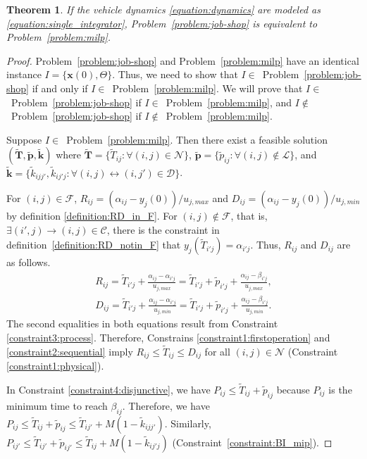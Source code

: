 \documentclass{sig-alternate}
\newtheorem{theorem}{Theorem}
\begin{document}
\begin{theorem}\label{theorem:P3_equivalent_P4}
	If the vehicle dynamics \eqref{equation:dynamics} are modeled as \eqref{equation:single_integrator}, Problem~\ref{problem:job-shop} is equivalent to Problem~\ref{problem:milp}.
\end{theorem}
\begin{proof}
	Problem~\ref{problem:job-shop} and Problem~\ref{problem:milp} have an identical instance $I=\{\mathbf{x}(0),\Theta\}$. Thus, we need to show that $I\in$~Problem~\ref{problem:job-shop} if and only if $I\in$~Problem~\ref{problem:milp}. We will prove that $I\in$~Problem~\ref{problem:job-shop} if $I\in$~Problem~\ref{problem:milp}, and $I\notin$~Problem~\ref{problem:job-shop} if $I\notin$~Problem~\ref{problem:milp}. 
	
	Suppose $I\in$~Problem~\ref{problem:milp}. Then there exist a feasible solution $(\tilde{\mathbf{T}},\tilde{\mathbf{p}},\tilde{\mathbf{k}})$ where $\tilde{\mathbf{T}}=\{\tilde{T}_{ij}:\forall(i,j)\in\mathcal{N}\}$, $\tilde{\mathbf{p}}=\{\tilde{p}_{ij}:\forall(i,j)\notin\mathcal{L}\}$, and $\tilde{\mathbf{k}}=\{\tilde{k}_{ijj'},\tilde{k}_{ij'j}:\forall(i,j)\leftrightarrow (i,j')\in\mathcal{D}\}$. 
	
	For $(i,j)\in\mathcal{F}$, $R_{ij}=(\alpha_{ij}-y_j(0))/u_{j,max}$ and $D_{ij}=(\alpha_{ij}-y_j(0))/u_{j,min}$ by definition \eqref{definition:RD_in_F}. For $(i,j)\notin\mathcal{F}$, that is, $\exists (i',j)\rightarrow (i,j)\in\mathcal{C}$, there is the constraint in definition~\eqref{definition:RD_notin_F} that $y_j(\tilde{T}_{i'j})=\alpha_{i'j}$. Thus, $R_{ij}$ and $D_{ij}$ are as follows.
	\begin{align*}
		R_{ij}=\tilde{T}_{i'j}+\frac{\alpha_{ij}-\alpha_{i'j}}{u_{j,max}}=\tilde{T}_{i'j}+\tilde{p}_{i'j}+\frac{\alpha_{ij}-\beta_{i'j}}{u_{j,max}}, \\	D_{ij}=\tilde{T}_{i'j}+\frac{\alpha_{ij}-\alpha_{i'j}}{u_{j,min}}=\tilde{T}_{i'j}+\tilde{p}_{i'j}+\frac{\alpha_{ij}-\beta_{i'j}}{u_{j,min}}.
	\end{align*}
	The second equalities in both equations result from Constraint \ref{constraint3:process}. Therefore, Constrains \ref{constraint1:firstoperation} and \ref{constraint2:sequential} imply $R_{ij}\leq \tilde{T}_{ij}\leq D_{ij}$ for all $(i,j)\in\mathcal{N}$ (Constraint \eqref{constraint1:physical}).
		
	In Constraint \ref{constraint4:disjunctive}, we have $P_{ij}\leq \tilde{T}_{ij}+\tilde{p}_{ij}$ because $P_{ij}$ is the minimum time to reach $\beta_{ij}$. Therefore, we have $P_{ij}\leq \tilde{T}_{ij}+\tilde{p}_{ij}\leq \tilde{T}_{ij'}+M(1-\tilde{k}_{ijj'})$. Similarly, $P_{ij'}\leq \tilde{T}_{ij'}+\tilde{p}_{ij'}\leq \tilde{T}_{ij}+M(1-\tilde{k}_{ij'j})$ (Constraint~\eqref{constraint:BI_mip}).
	

\end{proof}
\end{document}

